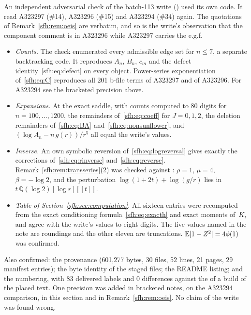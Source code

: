 \endgroup
\begin{writenote}\raggedright
An independent adversarial check of the batch-113 write () used its own code. It read A323297
(\#14), A323296 (\#15) and A323294 (\#34) again. The quotations of Remark~\ref{sfh:rem:oeis} are verbatim, and so
is the write's observation that the component comment is in A323296 while A323297 carries the e.g.f.
\begin{itemize}\raggedright
\item \emph{Counts.} The check enumerated every admissible edge set for $n\le7$, a separate backtracking code. It
reproduces $A_n$, $B_n$, $c_m$ and the defect identity~\eqref{sfh:eq:defect} on every object. Power-series
exponentiation of~\eqref{sfh:eq:C} reproduces all 201 b-file terms of A323297 and of A323296. For A323294 see the
bracketed precision above.
\item \emph{Expansions.} At the exact saddle, with counts computed to 80 digits for $n=100,\ldots,1200$, the
remainders of~\eqref{sfh:eq:coeff} for $J=0,1,2$, the deletion remainders of~\eqref{sfh:eq:BA}
and~\eqref{sfh:eq:nonsunflower}, and $(\log A_n-n\,g(r))/r^5$ all equal the write's values.
\item \emph{Inverse.} An own symbolic reversion of~\eqref{sfh:eq:logreversal} gives exactly the corrections
of~\eqref{sfh:eq:rinverse} and~\eqref{sfh:eq:reverse}. Remark~\ref{sfh:rem:transseries}(2) was checked against
: $\rho=1$, $\mu=4$, $\beta=-\log2$, and the perturbation
$\log(1+2t)+\log(g/r)$ lies in $t\,\mathbb Q(\log2)[\log r][[t]]$.
\item \emph{Table of Section~\ref{sfh:sec:computation}.} All sixteen entries were recomputed from the exact
conditioning formula~\eqref{sfh:eq:exacth} and exact moments of~$K$, and agree with the write's values to
eight digits. The five
values named in the note are roundings and the other eleven are truncations. $\mathbb E|1-Z^2|=4\phi(1)$ was confirmed.
\end{itemize}
Also confirmed: the provenance (601,277 bytes, 30 files, 52 lines, 21 pages, 29 manifest entries); the byte
identity of the staged files; the README listing; and the numbering, with 83 delivered labels and 0 differences
against the  of a build of the placed text. One precision was added in bracketed notes, on the A323294
comparison, in this section and in Remark~\ref{sfh:rem:oeis}. No claim of the write was found wrong.
\end{writenote}
